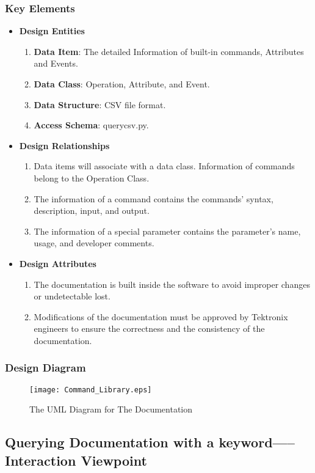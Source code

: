 \documentclass [10pt]{article}
\begin{document}
\subsubsection{Key Elements}
  \begin{itemize}
  \item \textbf{Design Entities}
        \begin{enumerate}
        \item \textbf{Data Item}: The detailed Information of built-in commands, Attributes and Events.
        \item \textbf{Data Class}: Operation, Attribute, and Event.
        \item \textbf{Data Structure}: CSV file format.
        \item \textbf{Access Schema}: querycsv.py.
        \end{enumerate}
  \item \textbf{Design Relationships}
  		\begin{enumerate}
  		\item Data items will associate with a data class. Information of commands belong to the Operation Class.
        \item The information of a command contains the commands' syntax, description, input, and output.
        \item The information of a special parameter contains the parameter's name, usage, and developer comments.
  		\end{enumerate}
  \item \textbf{Design Attributes}
  		\begin{enumerate}
  		\item The documentation is built inside the software to avoid improper changes or undetectable lost.
		\item Modifications of the documentation must be approved by Tektronix engineers to ensure the correctness and the consistency of the documentation.   
  		\end{enumerate}
  \end{itemize}
\subsubsection{Design Diagram}
\begin{figure}[ht]
\centering
\texttt{[image: Command\_Library.eps]}
\caption{The UML Diagram for The Documentation}
\end{figure}
\newpage
\subsection{Querying Documentation with a keyword-----Interaction Viewpoint}  
\end{document}
